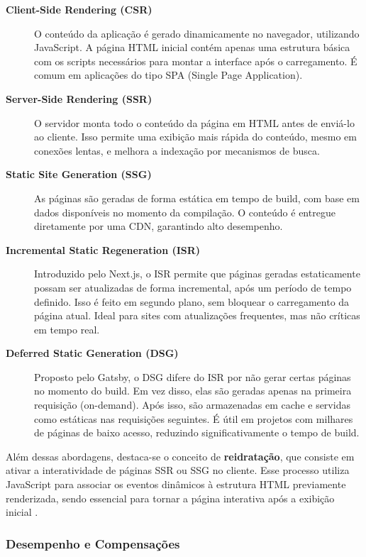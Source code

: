 \begin{description}
  \item[\textbf{Client-Side Rendering (CSR)}] 
  O conteúdo da aplicação é gerado dinamicamente no navegador, utilizando JavaScript. A página HTML inicial contém apenas uma estrutura básica com os scripts necessários para montar a interface após o carregamento. É comum em aplicações do tipo SPA (Single Page Application).
  
  \item[\textbf{Server-Side Rendering (SSR)}]
  O servidor monta todo o conteúdo da página em HTML antes de enviá-lo ao cliente. Isso permite uma exibição mais rápida do conteúdo, mesmo em conexões lentas, e melhora a indexação por mecanismos de busca.

  \item[\textbf{Static Site Generation (SSG)}]
  As páginas são geradas de forma estática em tempo de build, com base em dados disponíveis no momento da compilação. O conteúdo é entregue diretamente por uma CDN, garantindo alto desempenho.

  \item[\textbf{Incremental Static Regeneration (ISR)}]
  Introduzido pelo Next.js, o ISR permite que páginas geradas estaticamente possam ser atualizadas de forma incremental, após um período de tempo definido. Isso é feito em segundo plano, sem bloquear o carregamento da página atual. Ideal para sites com atualizações frequentes, mas não críticas em tempo real.

  \item[\textbf{Deferred Static Generation (DSG)}]
  Proposto pelo Gatsby, o DSG difere do ISR por não gerar certas páginas no momento do build. Em vez disso, elas são geradas apenas na primeira requisição (on-demand). Após isso, são armazenadas em cache e servidas como estáticas nas requisições seguintes. É útil em projetos com milhares de páginas de baixo acesso, reduzindo significativamente o tempo de build.
\end{description}

Além dessas abordagens, destaca-se o conceito de \textbf{reidratação}, que consiste em ativar a interatividade de páginas SSR ou SSG no cliente. Esse processo utiliza JavaScript para associar os eventos dinâmicos à estrutura HTML previamente renderizada, sendo essencial para tornar a página interativa após a exibição inicial \cite{osmani2025}.


\subsubsection{Desempenho e Compensações}

